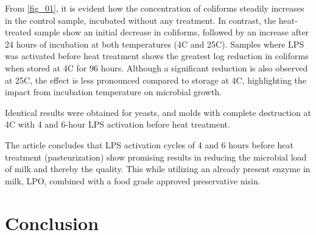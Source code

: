 From \ref*{fig_01}, it is evident how the concentration of coliforms steadily increases in the control sample, incubated without any treatment. In contrast, the heat-treated sample show an initial decrease in coliforms, followed by an increase after 24 hours of incubation at both temperatures (4\textdegree C and 25\textdegree C). Samples where LPS was activated before heat treatment shows the greatest log reduction in coliforms when stored at 4\textdegree C for 96 hours. Although a significant reduction is also observed at 25\textdegree C, the effect is less pronounced compared to storage at 4\textdegree C, highlighting the impact from incubation temperature on microbial growth.

\vline

Identical results were obtained for yeasts, and molds with complete destruction at 4\textdegree C with 4 and 6-hour LPS activation before heat treatment. 

\vline

The article concludes that LPS activation cycles of 4 and 6 hours before heat treatment (pasteurization) show promising results in reducing the microbial load of milk and thereby the quality. This while utilizing an already present enzyme in milk, LPO, combined with a food grade approved preservative nisin.

\section{Conclusion}
